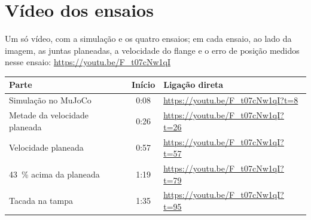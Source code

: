\section*{Vídeo dos ensaios}

Um só vídeo, com a simulação e os quatro ensaios; em cada ensaio, ao lado da
imagem, as juntas planeadas, a velocidade do flange e o erro de posição
medidos nesse ensaio: \url{https://youtu.be/F_t07cNw1qI}

\begin{table}[H]
\centering
\small
\begin{tabular}{lcl}
\toprule
\rowcolor{tabcab}
Parte & Início & Ligação direta \\
\midrule
Simulação no MuJoCo & 0:08 & \url{https://youtu.be/F_t07cNw1qI?t=8} \\
Metade da velocidade planeada & 0:26 & \url{https://youtu.be/F_t07cNw1qI?t=26} \\
Velocidade planeada & 0:57 & \url{https://youtu.be/F_t07cNw1qI?t=57} \\
\SI{43}{\percent} acima da planeada & 1:19 & \url{https://youtu.be/F_t07cNw1qI?t=79} \\
Tacada na tampa & 1:35 & \url{https://youtu.be/F_t07cNw1qI?t=95} \\
\bottomrule
\end{tabular}
\end{table}
